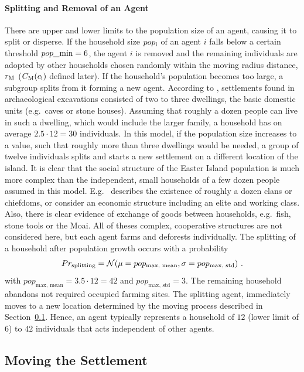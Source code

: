 \paragraph{Splitting and Removal of an Agent}
There are upper and lower limits to the population size of an agent, causing it to split or disperse.
If the household size $pop_{\rm i}$ of an agent $i$ falls below a certain threshold $pop\_{\rm min} = 6$, the agent $i$ is removed and the remaining individuals are adopted by other households chosen randomly within the moving radius distance, $r_{\rm M}$ ($C_{\rm M}(c_{\rm i})$ defined later).
If the household's population becomes too large, a subgroup splits from it forming a new agent.
According to \citet{Bahn2017}, settlements found in archaeological excavations consisted of two to three dwellings, the basic domestic units (e.g.\ caves or stone houses). 
Assuming that roughly a dozen people can live in such a dwelling, which would include the larger family, a household has on average $2.5\cdot 12 = 30$ individuals.
In this model, if the population size increases to a value, such that roughly more than three dwellings would be needed, a group of twelve individuals splits and starts a new settlement on a different location of the island. 
It is clear that the social structure of the Easter Island population is much more complex than the independent, small households of a few dozen people assumed in this model. 
E.g.\ \citet{Diamond2011} describes the existence of roughly a dozen clans or chiefdoms, or \citet{Puleston2017} consider an economic structure including an elite and working class.
Also, there is clear evidence of exchange of goods between households, e.g.\ fish, stone tools or the Moai.
All of theses complex, cooperative structures are not considered here, but each agent farms and deforests individually.
The splitting of a household after population growth occurs with a probability 
\begin{equation}
Pr_{\rm splitting} = \mathcal{N}( \mu = pop_\text{max, mean}, \sigma = pop_\text{max, std})\ .
\end{equation}
with $pop_\text{max, mean} = 3.5 \cdot 12 = 42$ and $pop_\text{max, std} = 3$.
The remaining household abandons not required occupied farming sites.
The splitting agent, immediately moves to a new location determined by the moving process described in Section~\ref{sec:Moving}.
Hence, an agent typically represents a household of $12$ (lower limit of $6$) to $42$ individuals that acts independent of other agents.

\subsection{Moving the Settlement}\label{sec:Moving}
